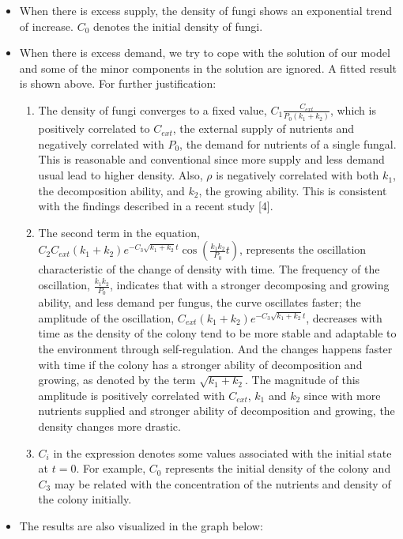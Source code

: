 \documentclass[12pt]{article}
\begin{document}
\begin{itemize}
	\item When there is excess supply, the density of fungi shows an exponential trend of increase. $C_{0}$ denotes the initial density of fungi.\\
	\item When there is excess demand, we try to cope with the solution of our model and some of the minor components in the solution are ignored. A fitted result is shown above. For further justification:
	\begin{enumerate}
		\item The density of fungi converges to a fixed value, $C_{1}\frac{C_{ext}}{P_{0}(k_{1}+k_{2})}$, which is positively correlated to $C_{ext}$, the external supply of nutrients and negatively correlated with $P_{0}$, the demand for nutrients of a single fungal. This is reasonable and conventional since more supply and less demand usual lead to higher density. Also, $\rho$ is negatively correlated with both $k_{1}$, the decomposition ability, and $k_{2}$, the growing ability. This is consistent with the findings described in a recent study [4].\\
		\item The second term in the equation, $C_{2}C_{ext}(k_{1}+k_{2})e^{-C_{3}\sqrt{k_{1}+k_{2}} t}\cos \left( \frac{k_{1}k_{2}}{P_{0}}t\right)$, represents the oscillation characteristic of the change of density with time. The frequency of the oscillation,  $\frac{k_{1}k_{2}}{P_{0}}$, indicates that with a stronger decomposing and growing ability, and less demand per fungus, the curve oscillates faster; the amplitude of the oscillation, $C_{ext}(k_{1}+k_{2})e^{-C_{3}\sqrt{k_{1}+k_{2}} t}$, decreases with time as the density of the colony tend to be more stable and adaptable to the environment through self-regulation. And the changes happens faster with time if the colony has a stronger ability of decomposition and growing, as denoted by the term $\sqrt{k_{1}+k_{2}}$. The magnitude of this amplitude is positively correlated with $C_{ext}$, $k_{1}$ and $k_{2}$ since with more nutrients supplied and stronger ability of decomposition and growing, the density changes more drastic.\\
		\item $C_{i}$ in the expression denotes some values associated with the initial state at $t=0$. For example, $C_{0}$ represents the initial density of the colony and $C_{3}$ may be related with the concentration of the nutrients and density of the colony initially.  
	\end{enumerate}
	\item The results are also visualized in the graph below:
\end{itemize}
\end{document}
